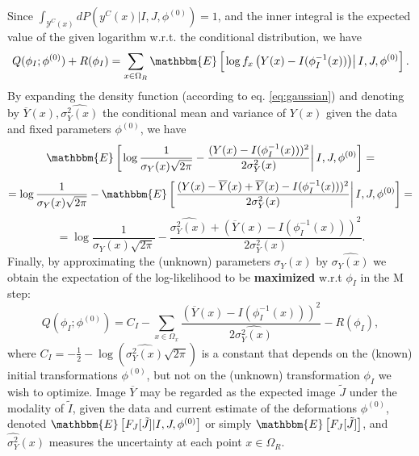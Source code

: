 Since \hbox{$\int_{\mathcal{Y}^{C}(x)}dP(y^{C}(x) | I, J, \phi^{(0)}) = 1$}, and the inner integral
is the expected value of the given logarithm w.r.t. the conditional distribution, we have
\begin{equation}
     Q(\phi_{I}; \phi^{(0)}) + R(\phi_{I}) = \sum_{x\in\Omega_{R}} \mathbbm{E} \left[\left.\log f_{x}\left(Y(x) - I(\phi^{-1}_{I}(x))\right) \right| I, J, \phi^{(0)}\right].
\end{equation}
By expanding the density function (according to eq. \ref{eq:gaussian}) and denoting by $\overline{Y}(x), \widehat{\sigma^{2}_{Y}(x)}$ the conditional mean and variance of $Y(x)$
given the data and fixed parameters $\phi^{(0)}$, we have
\begin{equation}
    \mathbbm{E} \left[\left.\log \frac{1}{\sigma_{Y}(x)\sqrt{2\pi}} - \frac{(Y(x) - I(\phi^{-1}_{I}(x)))^{2}}{2\sigma^{2}_{Y}(x)}\right|I, J, \phi^{(0)} \right] =
\end{equation}
\begin{equation}
    = \log \frac{1}{\sigma_{Y}(x)\sqrt{2\pi}} - \mathbbm{E} \left[\left. \frac{(Y(x) - \overline{Y}(x) + \overline{Y}(x) - I(\phi^{-1}_{I}(x)))^{2}}{2\sigma^{2}_{Y}(x)}\right|I, J, \phi^{(0)} \right]=
\end{equation}
\begin{equation}
    = \log \frac{1}{\sigma_{Y}(x)\sqrt{2\pi}} - \frac{\widehat{\sigma^{2}_{Y}(x)} + (\overline{Y}(x) - I(\phi^{-1}_{I}(x)))^{2}}{2\sigma^{2}_{Y}(x)}.
\end{equation}
Finally, by approximating the (unknown) parameters $\sigma_{Y}(x)$ by $\widehat{\sigma_{Y}(x)}$ we obtain the expectation of the log-likelihood to be \textbf{maximized} w.r.t $\phi_{I}$ in the M step:
\begin{equation}
    Q(\phi_{I}; \phi^{(0)}) = C_{I} - \sum_{x\in\Omega_{x}}\frac{(\overline{Y}(x) - I(\phi^{-1}_{I}(x)))^{2}}{2\widehat{\sigma^{2}_{Y}(x)}} - R(\phi_{I}),
\end{equation}
where $C_{I} = -\frac{1}{2} - \log\left(\widehat{\sigma^{2}_{Y}(x)}\sqrt{2\pi}\right)$ is a constant that depends on the (known) initial transformations $\phi^{(0)}$, but not on the
(unknown) transformation $\phi_{I}$ we wish to optimize. Image $\overline{Y}$ may be regarded as the expected image $\tilde{J}$ under the modality of $\tilde{I}$, given the data and current estimate of the
deformations $\phi^{(0)}$, denoted $\mathbbm{E}\left[F_{J}[\tilde{J}]|I, J, \phi^{(0)}\right]$ or simply $\mathbbm{E}\left[F_{J}[\tilde{J}]\right]$, and $\widehat{\sigma^{2}_{Y}}(x)$ measures the uncertainty at each point
$x\in \Omega_{R}$.\\

